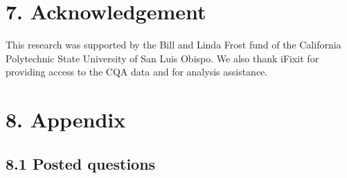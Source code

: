 \documentclass{article}
\begin{document}

\section*{7. Acknowledgement}

This research was supported by the Bill and Linda Frost fund of the California Polytechnic State University of San Luis Obispo. We also thank iFixit for providing access to the CQA data and for analysis assistance.


\section*{8. Appendix} 

\subsection*{8.1 Posted questions}

\end{document}
